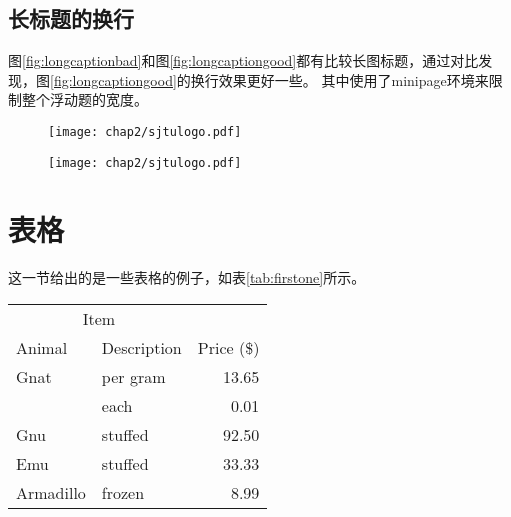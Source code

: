 \subsection{长标题的换行}
\label{sec:longcaption}

图\ref{fig:longcaptionbad}和图\ref{fig:longcaptiongood}都有比较长图标题，通过对比发现，图\ref{fig:longcaptiongood}的换行效果更好一些。
其中使用了minipage环境来限制整个浮动题的宽度。

\begin{figure}[!htp]
 \centering
 \texttt{[image: chap2/sjtulogo.pdf]}
\end{figure}

\begin{figure}[!hbp]
  \centering
  \begin{minipage}[b]{0.6\textwidth}
    \captionstyle{\centering}
    \centering
    \texttt{[image: chap2/sjtulogo.pdf]}
  \end{minipage}     
\end{figure}
  

\section{表格}
\label{sec:tab}

这一节给出的是一些表格的例子，如表\ref{tab:firstone}所示。

\begin{table}[!hpb]
  \centering
  \begin{tabular}{@{}llr@{}} \toprule
    \multicolumn{2}{c}{Item} \\ \cmidrule(r){1-2}
    Animal & Description & Price (\$)\\ \midrule
    Gnat & per gram & 13.65 \\
    & each & 0.01 \\
    Gnu & stuffed & 92.50 \\
    Emu & stuffed & 33.33 \\
    Armadillo & frozen & 8.99 \\ \bottomrule
  \end{tabular}
\end{table}

